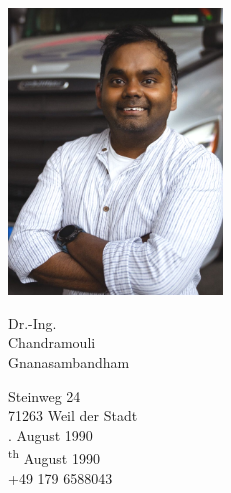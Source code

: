 \documentclass{mycv}
\begin{document}
\sloppy %
\color{templateColor1}

\normalfont
\begin{minipage}[c]{0.32\textwidth}
  \includegraphics[width=5.7cm]{../img/CV_Photo_Informal_Comp.png}
\end{minipage}
\begin{minipage}[]{0.8\textwidth}
    \vspace{5mm}

    {\huge Dr.-Ing. }\\

    {\Huge Chandramouli}\\

    {\Huge Gnanasambandham}
    \vspace{2mm}

    \vspace{2mm}

    {\large
        Steinweg 24\\
        71263 Weil der Stadt\\

        {
            . August 1990\\
        }
        {
            \textsuperscript{th} August 1990\\
        }
        \telephoneIcon +49 179 6588043\\
        \mailIcon \href{mailto:chandramouli681990@gmail.com}{}
    }
  
    \vspace{13mm}
\end{minipage}
\end{document}
